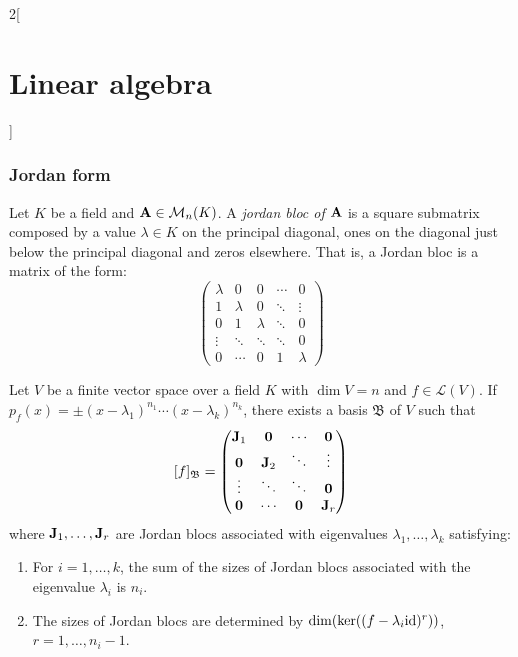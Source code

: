 \documentclass[../../../main.tex]{subfiles}
\begin{document}
\begin{multicols}{2}[\section{Linear algebra}]
  \subsubsection{Jordan form}
  \begin{definition}
    Let $K$ be a field and $\boldsymbol{\mathrm{A}}\in\mathcal{M}_n(K)$. A \textit{jordan bloc of $\boldsymbol{\mathrm{A}}$} is a square submatrix composed by a value $\lambda\in K$ on the principal diagonal, ones on the diagonal just below the principal diagonal and zeros elsewhere. That is, a Jordan bloc is a matrix of the form:
    $$
      \begin{pmatrix}
        \lambda & 0       & 0       & \cdots & 0       \\
        1       & \lambda & 0       & \ddots & \vdots  \\
        0       & 1       & \lambda & \ddots & 0       \\
        \vdots  & \ddots  & \ddots  & \ddots & 0       \\
        0       & \cdots  & 0       & 1      & \lambda
      \end{pmatrix}
    $$
  \end{definition}
  \begin{prop}
    Let $V$ be a finite vector space over a field $K$ with $\dim V=n$ and $f\in\mathcal{L}(V)$. If $p_f(x)=\pm(x-\lambda_1)^{n_1}\cdots(x-\lambda_k)^{n_k}$, there exists a basis $\mathfrak{B}$ of $V$ such that
    $$[f]_{\mathfrak{B}}=
      \begin{pmatrix}
        \boldsymbol{\mathrm{J}}_1 & \boldsymbol{\mathrm{0}}   & \cdots             & \boldsymbol{\mathrm{0}}   \\
        \boldsymbol{\mathrm{0}}   & \boldsymbol{\mathrm{J}}_2 & \ddots             & \vdots               \\
        \vdots               & \ddots               & \ddots             & \boldsymbol{\mathrm{0}}   \\
        \boldsymbol{\mathrm{0}}   & \cdots               & \boldsymbol{\mathrm{0}} & \boldsymbol{\mathrm{J}}_r \\
      \end{pmatrix}
    $$
    where $\boldsymbol{\mathrm{J}}_1,\ldots,\boldsymbol{\mathrm{J}}_r$ are Jordan blocs associated with eigenvalues $\lambda_1,\ldots,\lambda_k$ satisfying:
    \begin{enumerate}
      \item\label{LA_diag1} For $i=1,\ldots,k$, the sum of the sizes of Jordan blocs associated with the eigenvalue $\lambda_i$ is $n_i$.
      \item\label{LA_diag2} The sizes of Jordan blocs are determined by $\dim(\ker((f-\lambda_i\mathrm{id})^r))$, $r=1,\ldots,n_i-1$.

\end{enumerate}
\end{prop}
\end{multicols}
\end{document}
